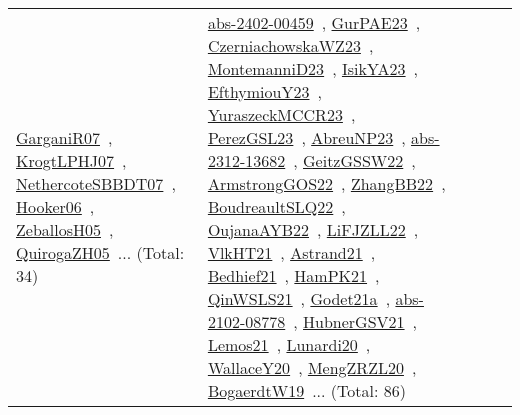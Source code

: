 {\begin{longtable}{lp{3cm}>{\raggedright\arraybackslash}p{6cm}>{\raggedright\arraybackslash}p{6cm}>{\raggedright\arraybackslash}p{8cm}}
\href{works/GarganiR07.pdf}{GarganiR07}~\cite{GarganiR07}, \href{works/KrogtLPHJ07.pdf}{KrogtLPHJ07}~\cite{KrogtLPHJ07}, \href{works/NethercoteSBBDT07.pdf}{NethercoteSBBDT07}~\cite{NethercoteSBBDT07}, \href{works/Hooker06.pdf}{Hooker06}~\cite{Hooker06}, \href{works/ZeballosH05.pdf}{ZeballosH05}~\cite{ZeballosH05}, \href{works/QuirogaZH05.pdf}{QuirogaZH05}~\cite{QuirogaZH05}... (Total: 34) & \href{works/abs-2402-00459.pdf}{abs-2402-00459}~\cite{abs-2402-00459}, \href{works/GurPAE23.pdf}{GurPAE23}~\cite{GurPAE23}, \href{works/CzerniachowskaWZ23.pdf}{CzerniachowskaWZ23}~\cite{CzerniachowskaWZ23}, \href{works/MontemanniD23.pdf}{MontemanniD23}~\cite{MontemanniD23}, \href{works/IsikYA23.pdf}{IsikYA23}~\cite{IsikYA23}, \href{works/EfthymiouY23.pdf}{EfthymiouY23}~\cite{EfthymiouY23}, \href{works/YuraszeckMCCR23.pdf}{YuraszeckMCCR23}~\cite{YuraszeckMCCR23}, \href{works/PerezGSL23.pdf}{PerezGSL23}~\cite{PerezGSL23}, \href{works/AbreuNP23.pdf}{AbreuNP23}~\cite{AbreuNP23}, \href{works/abs-2312-13682.pdf}{abs-2312-13682}~\cite{abs-2312-13682}, \href{works/GeitzGSSW22.pdf}{GeitzGSSW22}~\cite{GeitzGSSW22}, \href{works/ArmstrongGOS22.pdf}{ArmstrongGOS22}~\cite{ArmstrongGOS22}, \href{works/ZhangBB22.pdf}{ZhangBB22}~\cite{ZhangBB22}, \href{works/BoudreaultSLQ22.pdf}{BoudreaultSLQ22}~\cite{BoudreaultSLQ22}, \href{works/OujanaAYB22.pdf}{OujanaAYB22}~\cite{OujanaAYB22}, \href{works/LiFJZLL22.pdf}{LiFJZLL22}~\cite{LiFJZLL22}, \href{works/VlkHT21.pdf}{VlkHT21}~\cite{VlkHT21}, \href{works/Astrand21.pdf}{Astrand21}~\cite{Astrand21}, \href{works/Bedhief21.pdf}{Bedhief21}~\cite{Bedhief21}, \href{works/HamPK21.pdf}{HamPK21}~\cite{HamPK21}, \href{works/QinWSLS21.pdf}{QinWSLS21}~\cite{QinWSLS21}, \href{works/Godet21a.pdf}{Godet21a}~\cite{Godet21a}, \href{works/abs-2102-08778.pdf}{abs-2102-08778}~\cite{abs-2102-08778}, \href{works/HubnerGSV21.pdf}{HubnerGSV21}~\cite{HubnerGSV21}, \href{works/Lemos21.pdf}{Lemos21}~\cite{Lemos21}, \href{works/Lunardi20.pdf}{Lunardi20}~\cite{Lunardi20}, \href{works/WallaceY20.pdf}{WallaceY20}~\cite{WallaceY20}, \href{works/MengZRZL20.pdf}{MengZRZL20}~\cite{MengZRZL20}, \href{works/BogaerdtW19.pdf}{BogaerdtW19}~\cite{BogaerdtW19}... (Total: 86)\\

\end{longtable}}
